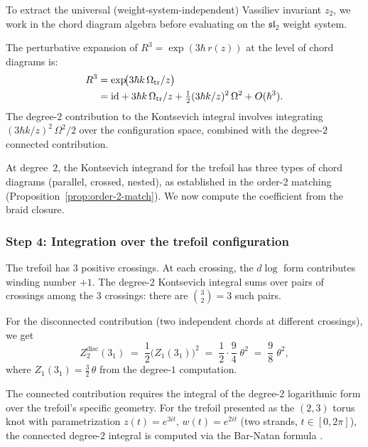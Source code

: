 \documentclass[11pt]{article}
\newcommand{\fsl}{\mathfrak{sl}}
\newcommand{\id}{\mathrm{id}}
\begin{document}
To extract the universal (weight-system-independent) Vassiliev
invariant $z_2$, we work in the chord diagram algebra before
evaluating on the $\fsl_2$ weight system.

The perturbative expansion of $R^3 = \exp(3\hbar\,r(z))$ at the
level of chord diagrams is:
\begin{align}
  R^3
  &= \exp\!\bigl(3\hbar k\,\Omega_{\mathrm{tr}}/z\bigr)
  \notag\\
  &= \id
  + 3\hbar k\,\Omega_{\mathrm{tr}}/z
  + \tfrac{1}{2}(3\hbar k/z)^2\,\Omega^2
  + O(\hbar^3).
  \label{eq:R-cubed-expansion}
\end{align}
The degree-$2$ contribution to the Kontsevich integral involves
integrating $(3\hbar k/z)^2\,\Omega^2/2$ over the
configuration space, combined with the degree-$2$ connected
contribution.

At degree~$2$, the Kontsevich integrand for the trefoil has
three types of chord diagrams (parallel, crossed, nested),
as established in the order-$2$ matching (Proposition~\ref{prop:order-2-match}).  We now
compute the coefficient from the braid closure.

\subsubsection{Step 4: Integration over the trefoil configuration}

The trefoil has $3$ positive crossings.  At each crossing, the
$d\log$ form contributes winding number $+1$.  The degree-$2$
Kontsevich integral sums over pairs of crossings among the $3$
crossings: there are $\binom{3}{2} = 3$ such pairs.

For the disconnected contribution (two independent chords at
different crossings), we get
\begin{equation}\label{eq:degree-2-disconnected}
  Z_2^{\mathrm{disc}}(3_1)
  \;=\;
  \frac{1}{2}\bigl(Z_1(3_1)\bigr)^2
  \;=\;
  \frac{1}{2}\cdot\frac{9}{4}\;\theta^2
  \;=\;
  \frac{9}{8}\;\theta^2,
\end{equation}
where $Z_1(3_1) = \frac{3}{2}\,\theta$ from the degree-$1$ computation.

The connected contribution requires the integral of the
degree-$2$ logarithmic form over the trefoil's specific geometry.
For the trefoil presented as the $(2,3)$ torus knot with
parametrization $z(t) = e^{3it}$, $w(t) = e^{2it}$
(two strands, $t \in [0, 2\pi]$), the connected degree-$2$
integral is computed via the Bar-Natan formula
\cite{BarNatan95}.
\end{document}
